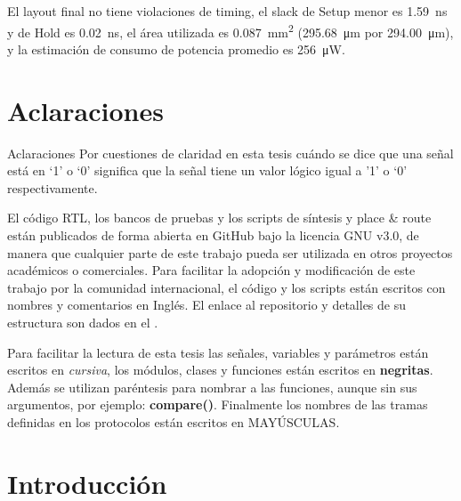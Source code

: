 \documentclass[a4paper, twoside, 11pt]{report}
\begin{document}
El layout final no tiene violaciones de timing, el slack de Setup menor es \SI{1,59}{\nano\second} y de Hold es \SI{0,02}{\nano\second}, el área utilizada es \SI{0,087}{\milli\meter\squared} (\SI{295,68}{\micro\meter} por \SI{294,00}{\micro\meter}), y la estimación de consumo de potencia promedio es \SI{256}{\micro\watt}.


\FloatBarrier
\chapter*{Aclaraciones}

Aclaraciones
Por cuestiones de claridad en esta tesis cuándo se dice que una señal está en ‘1’ o ‘0’ significa que la señal tiene un valor lógico igual a '1' o ‘0’ respectivamente.

El código RTL, los bancos de pruebas y los scripts de síntesis y place \& route están publicados de forma abierta en GitHub bajo la licencia GNU v3.0, de manera que cualquier parte de este trabajo pueda ser utilizada en otros proyectos académicos o comerciales. Para facilitar la adopción y modificación de este trabajo por la comunidad internacional, el código y los scripts están escritos con nombres y comentarios en Inglés. El enlace al repositorio y detalles de su estructura son dados en el .

Para facilitar la lectura de esta tesis las señales, variables y parámetros están escritos en \textit{cursiva},  los módulos, clases y funciones están escritos en \textbf{negritas}. Además se utilizan paréntesis para nombrar a las funciones, aunque sin sus argumentos, por ejemplo: \textbf{compare()}. Finalmente los nombres de las tramas definidas en los protocolos están escritos en MAYÚSCULAS.

\newpage
\tableofcontents


\FloatBarrier
\chapter{Introducción}
\end{document}
